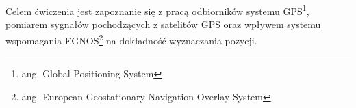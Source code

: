 \akapit Celem ćwiczenia jest zapoznanie się z pracą odbiorników systemu GPS\footnote{ang. Global Positioning System}, pomiarem sygnałów pochodzących z satelitów GPS oraz wpływem systemu wspomagania EGNOS\footnote{ang. European Geostationary Navigation Overlay System} na dokładność wyznaczania pozycji.